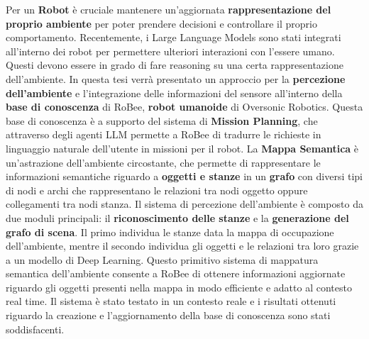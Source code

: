 Per un \textbf{Robot} è cruciale mantenere un'aggiornata \textbf{rappresentazione del proprio ambiente} per poter prendere decisioni e controllare il proprio comportamento. Recentemente, i Large Language Models sono stati integrati all'interno dei robot per permettere ulteriori interazioni con l'essere umano. Questi devono essere in grado di fare reasoning su una certa rappresentazione dell'ambiente.
In questa tesi verrà presentato un approccio per la \textbf{percezione dell'ambiente} e l'integrazione delle informazioni del sensore all'interno della \textbf{base di conoscenza} di RoBee, \textbf{robot umanoide} di Oversonic Robotics. Questa base di conoscenza è a supporto del sistema di \textbf{Mission Planning}, che attraverso degli agenti LLM permette a RoBee di tradurre le richieste in linguaggio naturale dell'utente in missioni per il robot.
La \textbf{Mappa Semantica} è un'astrazione dell'ambiente circostante, che permette di rappresentare le informazioni semantiche riguardo a \textbf{oggetti e stanze} in un \textbf{grafo} con diversi tipi di nodi e archi che rappresentano le relazioni tra nodi oggetto oppure collegamenti tra nodi stanza.
Il sistema di percezione dell'ambiente è composto da due moduli principali: il \textbf{riconoscimento delle stanze} e la \textbf{generazione del grafo di scena}. Il primo individua le stanze data la mappa di occupazione dell'ambiente, mentre il secondo individua gli oggetti e le relazioni tra loro grazie a un modello di Deep Learning.
Questo primitivo sistema di mappatura semantica dell'ambiente consente a RoBee di ottenere informazioni aggiornate riguardo gli oggetti presenti nella mappa in modo efficiente e adatto al contesto real time.
Il sistema è stato testato in un contesto reale e i risultati ottenuti riguardo la creazione e l'aggiornamento della base di conoscenza sono stati soddisfacenti.

